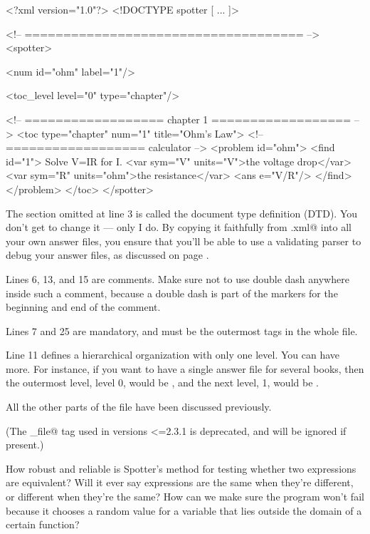 \documentclass{doc}
\begin{document}
\begin{listing}{1}
<?xml version="1.0"?>
<!DOCTYPE spotter [
...
]>

<!-- ==================================== -->
<spotter>

<num id="ohm" label="1"/>

 <toc_level level="0" type="chapter"/>

<!-- ================== chapter 1 ================== -->
<toc type="chapter" num="1" title="Ohm's Law">
 <!-- ================== calculator -->
   <problem id="ohm">
        <find id="1">
          Solve V=IR for I.
          <var sym="V" units="V">the voltage drop</var>
          <var sym="R" units="ohm">the resistance</var>
          <ans e="V/R"/>
        </find>
    </problem>
</toc>
</spotter>\end{listing}
 
 The section omitted at line 3 is called the document type definition (DTD).
 You don't get to change it --- only I do. By copying it faithfully from
 \verb@sample.xml@ into all your own answer files, you ensure that
  you'll be able to use a validating parser to debug your answer files,
  as discussed on page \pageref{debugginganswerfile}.
  
  Lines 6, 13, and 15 are comments. Make sure not to use double dash anywhere
  inside such a comment, because a double dash is part of the markers for the
  beginning and end of the comment.
  
  Lines 7 and 25 are mandatory, and must be the outermost tags in the whole file.
  
  Line 11 defines a hierarchical organization with only one level. You can have
  more. For instance, if you want to have a single answer file for several books,
  then the outermost level, level 0, would be \verb@book@, and the next level, 1, 
  would be \verb@chapter@.
  
  All the other parts of the file have been discussed previously.
  
(The \verb@log_file@ tag used in versions <=2.3.1 is deprecated, and will be ignored if present.)
 
How robust and reliable is Spotter's method for testing whether two expressions are equivalent?
Will it ever say expressions are the same when they're different, or different when they're
the same? How can we make sure the program won't fail because it chooses a random
value for a variable that lies outside the domain of a certain function?
\end{document}
